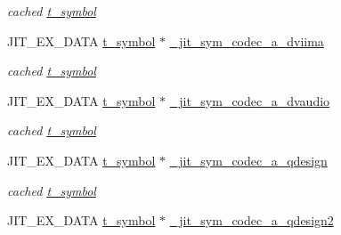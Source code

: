 \begin{DoxyCompactItemize}
\begin{DoxyCompactList}\small\item\em cached \hyperlink{structt__symbol}{t\_\-symbol} \item\end{DoxyCompactList}\item 
\hypertarget{group__jitter_ga01d79d25ac337c822b7bd8d921a970bb}{
JIT\_\-EX\_\-DATA \hyperlink{structt__symbol}{t\_\-symbol} $\ast$ \hyperlink{group__jitter_ga01d79d25ac337c822b7bd8d921a970bb}{\_\-jit\_\-sym\_\-codec\_\-a\_\-dviima}}
\label{group__jitter_ga01d79d25ac337c822b7bd8d921a970bb}

\begin{DoxyCompactList}\small\item\em cached \hyperlink{structt__symbol}{t\_\-symbol} \item\end{DoxyCompactList}\item 
\hypertarget{group__jitter_gab956fb931bdf7e3e2b336e6bad06c9cd}{
JIT\_\-EX\_\-DATA \hyperlink{structt__symbol}{t\_\-symbol} $\ast$ \hyperlink{group__jitter_gab956fb931bdf7e3e2b336e6bad06c9cd}{\_\-jit\_\-sym\_\-codec\_\-a\_\-dvaudio}}
\label{group__jitter_gab956fb931bdf7e3e2b336e6bad06c9cd}

\begin{DoxyCompactList}\small\item\em cached \hyperlink{structt__symbol}{t\_\-symbol} \item\end{DoxyCompactList}\item 
\hypertarget{group__jitter_ga3f264bbac66d519d81123820a1ce16de}{
JIT\_\-EX\_\-DATA \hyperlink{structt__symbol}{t\_\-symbol} $\ast$ \hyperlink{group__jitter_ga3f264bbac66d519d81123820a1ce16de}{\_\-jit\_\-sym\_\-codec\_\-a\_\-qdesign}}
\label{group__jitter_ga3f264bbac66d519d81123820a1ce16de}

\begin{DoxyCompactList}\small\item\em cached \hyperlink{structt__symbol}{t\_\-symbol} \item\end{DoxyCompactList}\item 
\hypertarget{group__jitter_ga967d6a3b2f2b729c9d783c183c9c1e43}{
JIT\_\-EX\_\-DATA \hyperlink{structt__symbol}{t\_\-symbol} $\ast$ \hyperlink{group__jitter_ga967d6a3b2f2b729c9d783c183c9c1e43}{\_\-jit\_\-sym\_\-codec\_\-a\_\-qdesign2}}
\label{group__jitter_ga967d6a3b2f2b729c9d783c183c9c1e43}


\end{DoxyCompactItemize}

